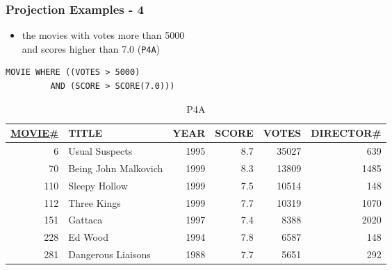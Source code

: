\documentclass[dvipsnames]{beamer}
\theoremstyle{plain}
\begin{document}
\begin{frame}[fragile]
  \frametitle{Projection Examples - 4}

  \begin{example}
    \begin{itemize}
      \item the movies with votes more than 5000\\
        and scores higher than 7.0 (\texttt{P4A})
    \end{itemize}

    \begin{lstlisting}
MOVIE WHERE ((VOTES > 5000)
         AND (SCORE > SCORE(7.0)))
    \end{lstlisting}

    \pause
    \vspace{-10pt}
    \begin{tiny}
    \begin{table}
      \caption{P4A}
      \begin{tabular}{|r|l|r|r|r|r|}\hline
\underline{MOVIE\#} & TITLE & YEAR & SCORE & VOTES & DIRECTOR\#\\[2pt]\hline\hline
   6 & Usual Suspects       & 1995 &   8.7 & 35027 &        639\\\hline
  70 & Being John Malkovich & 1999 &   8.3 & 13809 &       1485\\\hline
 110 & Sleepy Hollow        & 1999 &   7.5 & 10514 &        148\\\hline
 112 & Three Kings          & 1999 &   7.7 & 10319 &       1070\\\hline
 151 & Gattaca              & 1997 &   7.4 &  8388 &       2020\\\hline
 228 & Ed Wood              & 1994 &   7.8 &  6587 &        148\\\hline
 281 & Dangerous Liaisons   & 1988 &   7.7 &  5651 &        292\\\hline
      \end{tabular}
    \end{table}
    \end{tiny}
  \end{example}
\end{frame}
\end{document}
